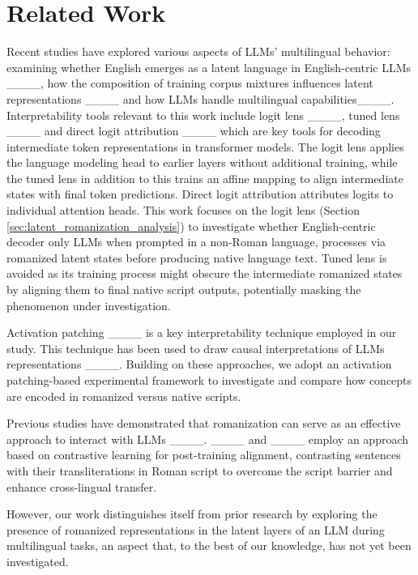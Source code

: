 \section{Related Work}
Recent studies have explored various aspects of LLMs' multilingual behavior: examining whether English emerges as a latent language in English-centric LLMs ____, how the composition of training corpus mixtures influences latent representations ____ and how LLMs handle multilingual capabilities____. Interpretability tools relevant to this work include logit lens ____, tuned lens ____ and direct logit attribution ____ which are key tools for decoding intermediate token representations in transformer models. The logit lens applies the language modeling head to earlier layers without additional training, while the tuned lens in addition to this trains an affine mapping to align intermediate states with final token predictions. Direct logit attribution attributes logits to individual attention heads. This work focuses on the logit lens (Section \ref{sec:latent_romanization_analysis}) to investigate whether English-centric decoder only LLMs when prompted in a non-Roman language, processes via romanized latent states before producing native language text. Tuned lens is avoided as its training process might obscure the intermediate romanized states by aligning them to final native script outputs, potentially masking the phenomenon under investigation.

Activation patching ____ is a key interpretability technique employed in our study. This technique has been used to draw causal interpretations of LLMs representations ____. Building on these approaches, we adopt an activation patching-based experimental framework to investigate and compare how concepts are encoded in romanized versus native scripts.

Previous studies have demonstrated that romanization can serve as an effective approach to interact with LLMs ____. ____ and ____ employ an approach based on contrastive learning for post-training alignment, contrasting sentences with their transliterations in Roman script to overcome the script barrier and enhance cross-lingual transfer.


However, our work distinguishes itself from prior research by exploring the presence of romanized representations in the latent layers of an LLM during multilingual tasks, an aspect that, to the best of our knowledge, has not yet been investigated.